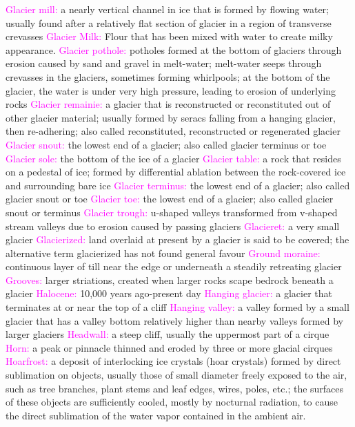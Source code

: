 \documentclass{article}
\newcommand{\pink}[1]{\textcolor{magenta}{#1}}
\newcommand{\vocab}[1]{{\pink{#1}}}
\begin{document}
\begin{multicols*}{4}
		\vocab{        Glacier mill: } a nearly vertical channel in ice that is formed by flowing water; usually found after a relatively flat section of glacier in a region of transverse crevasses 
		\vocab{Glacier Milk: } Flour that has been mixed with water to create milky appearance. 
		\vocab{        Glacier pothole: } potholes formed at the bottom of glaciers through erosion caused by sand and gravel in melt-water; melt-water seeps through crevasses in the glaciers, sometimes forming whirlpools; at the bottom of the glacier, the water is under very high pressure, leading to erosion of underlying rocks 
		\vocab{        Glacier remainie: } a glacier that is reconstructed or reconstituted out of other glacier material; usually formed by seracs falling from a hanging glacier, then re-adhering; also called reconstituted, reconstructed or regenerated glacier 
		\vocab{        Glacier snout: } the lowest end of a glacier; also called glacier terminus or toe 
		\vocab{        Glacier sole: } the bottom of the ice of a glacier 
		\vocab{        Glacier table: } a rock that resides on a pedestal of ice; formed by differential ablation between the rock-covered ice and surrounding bare ice 
		\vocab{        Glacier terminus: } the lowest end of a glacier; also called glacier snout or toe 
		\vocab{        Glacier toe: } the lowest end of a glacier; also called glacier snout or terminus
		\vocab{        Glacier trough: } u-shaped valleys transformed from v-shaped stream valleys due to erosion caused by passing glaciers 
		\vocab{        Glacieret: } a very small glacier 
		\vocab{        Glacierized: } land overlaid at present by a glacier is said to be covered; the alternative term glacierized has not found general favour 
		\vocab{        Ground moraine: } continuous layer of till near the edge or underneath a steadily retreating glacier 
		\vocab{Grooves: } larger striations, created when larger rocks scape bedrock beneath a glacier  
		\vocab{ Halocene: } 10,000 years ago-present day
		\vocab{        Hanging glacier: } a glacier that terminates at or near the top of a cliff 
		\vocab{        Hanging valley: } a valley formed by a small glacier that has a valley bottom relatively higher than nearby valleys formed by larger glaciers 
		\vocab{        Headwall: } a steep cliff, usually the uppermost part of a cirque 
		\vocab{        Horn: } a peak or pinnacle thinned and eroded by three or more glacial cirques 
		\vocab{Hoarfrost:} a deposit of interlocking ice crystals (hoar crystals) formed by direct sublimation on objects, usually those of small diameter freely exposed to the air, such as tree branches, plant stems and leaf edges, wires, poles, etc.; the surfaces of these objects are sufficiently cooled, mostly by nocturnal radiation, to cause the direct sublimation of the water vapor contained in the ambient air.

\end{multicols*}
\end{document}
